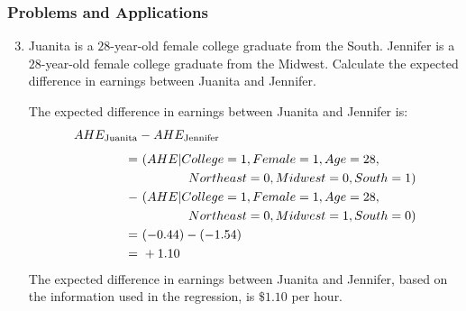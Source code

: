 \begin{frame}
\frametitle{Problems and Applications}

\begin{enumerate}\setcounter{enumi}{2}

\item Juanita is a $28$-year-old female college graduate from the South. Jennifer is a $28$-year-old female college graduate from the Midwest. Calculate the expected difference in earnings between Juanita and Jennifer.

\begin{answer}
The expected difference in earnings between Juanita and Jennifer is:
\begin{align*}
AHE_{\text{Juanita}} & - AHE_{\text{Jennifer}} \\[1ex]
  = &~ (AHE | College=1, Female=1, Age=28, \\
    & \hspace*{4em} Northeast=0, Midwest=0, South=1)\\ 
  - &~ (AHE | College=1, Female=1, Age=28, \\
    & \hspace*{4em} Northeast=0, Midwest=1, South=0)\\ 
  = &~ (-0.44) - (-1.54) \\
  = &~ + 1.10
\end{align*}
The expected difference in earnings between Juanita and Jennifer, based on the information used in the regression, is $\$1.10$ per hour.
\end{answer}

\end{enumerate}
\end{frame}




